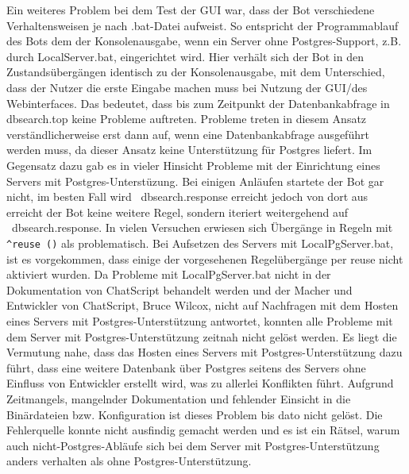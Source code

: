 Ein weiteres Problem bei dem Test der GUI war, dass der Bot verschiedene Verhaltensweisen je nach .bat-Datei aufweist. So entspricht der Programmablauf des Bots dem der Konsolenausgabe, wenn ein Server ohne Postgres-Support, z.B. durch LocalServer.bat, eingerichtet wird. Hier verhält sich der Bot in den Zustandsübergängen identisch zu der Konsolenausgabe, mit dem Unterschied, dass der Nutzer die erste Eingabe machen muss bei Nutzung der GUI/des Webinterfaces. Das bedeutet, dass bis zum Zeitpunkt der Datenbankabfrage in dbsearch.top keine Probleme auftreten. Probleme treten in diesem Ansatz verständlicherweise erst dann auf, wenn eine Datenbankabfrage ausgeführt werden muss, da dieser Ansatz keine Unterstützung für Postgres liefert. 
Im Gegensatz dazu gab es in vieler Hinsicht Probleme mit der Einrichtung eines Servers mit Postgres-Unterstüzung. Bei einigen Anläufen startete der Bot gar nicht, im besten Fall wird ~dbsearch.response erreicht jedoch von dort aus erreicht der Bot keine weitere Regel, sondern iteriert weitergehend auf ~dbsearch.response. In vielen Versuchen erwiesen sich Übergänge in Regeln mit \lstinline|^reuse ()| als problematisch. Bei Aufsetzen des Servers mit LocalPgServer.bat, ist es vorgekommen, dass einige der vorgesehenen Regelübergänge per reuse nicht aktiviert wurden. 
Da Probleme mit LocalPgServer.bat nicht in der Dokumentation von ChatScript behandelt werden und der Macher und Entwickler von ChatScript, Bruce Wilcox, nicht auf Nachfragen mit dem Hosten eines Servers mit Postgres-Unterstützung antwortet, konnten alle Probleme mit dem Server mit Postgres-Unterstützung zeitnah nicht gelöst werden. Es liegt die Vermutung nahe, dass das Hosten eines Servers mit Postgres-Unterstützung dazu führt, dass eine weitere Datenbank über Postgres seitens des Servers ohne Einfluss von Entwickler erstellt wird, was zu allerlei Konflikten führt. Aufgrund Zeitmangels, mangelnder Dokumentation und fehlender Einsicht in die Binärdateien bzw. Konfiguration ist dieses Problem bis dato nicht gelöst. Die Fehlerquelle konnte nicht ausfindig gemacht werden und es ist ein Rätsel, warum auch nicht-Postgres-Abläufe sich bei dem Server mit Postgres-Unterstützung anders verhalten als ohne Postgres-Unterstützung. 
